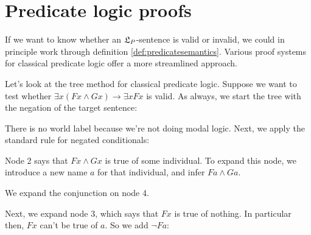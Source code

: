 


\section{Predicate logic proofs}

If we want to know whether an $\mathfrak{L}_{P}$-sentence is valid or invalid, we
could in principle work through definition \ref{def:predicatesemantics}. Various
proof systems for classical predicate logic offer a more streamlined approach.

Let's look at the tree method for classical predicate logic. Suppose we want to
test whether $\exists x(Fx \land Gx) \to \exists x Fx$ is valid. As always, we
start the tree with the negation of the target sentence:

\medskip
\begin{center}
\end{center}
\medskip%
There is no world label because we're not doing modal logic. Next, we apply the
standard rule for negated conditionals:%
\medskip
\begin{center}
\end{center}

\medskip\noindent
Node 2 says that $Fx \land Gx$ is true of some individual. To
expand this node, we introduce a new name $a$ for that individual, and infer
$Fa \land Ga$.
\medskip
\begin{center}
\end{center}

\medskip\noindent%
We expand the conjunction on node 4.
\medskip
\begin{center}
\end{center}
Next, we expand node 3, which says that $Fx$ is true of nothing. In particular
then, $Fx$ can't be true of $a$. So we add $\neg Fa$:


